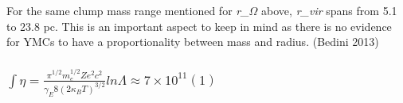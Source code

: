 For the same clump mass range mentioned for \textit{r_{$\Omega$}} above, \textit{r_{vir}} spans from 5.1 to 23.8 pc. This is an important aspect to keep in mind as there is no evidence for YMCs to have a proportionality between mass and radius. (Bedini 2013)

\subsubsection{$∫\eta=\frac{\pi^{1/2}m^{1/2}_{e}Ze^{2}c^{2}}{\gamma_{E}8(2\kappa_{B}T)^{3/2}} lnΛ\approx7×10^{11}      (1)$}



